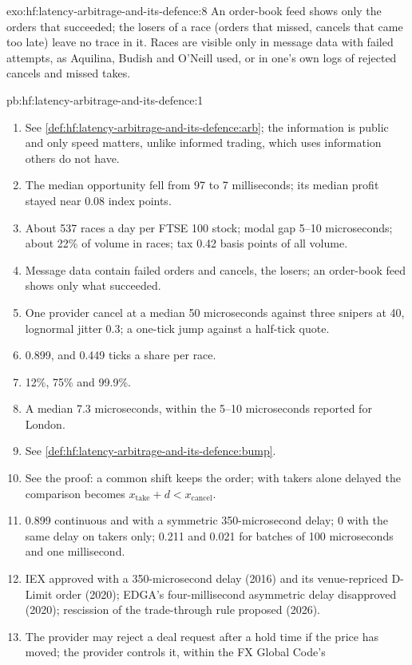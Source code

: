 \begin{solution}{exo:hf:latency-arbitrage-and-its-defence:8}
An order-book feed shows only the orders that succeeded; the losers of a race (orders that missed, cancels that came too late) leave no trace in it.
Races are visible only in message data with failed attempts, as Aquilina, Budish and O'Neill used, or in one's own logs of rejected cancels and
missed takes.
\end{solution}

\begin{solution}{pb:hf:latency-arbitrage-and-its-defence:1}
\begin{enumerate}
\item See \cref{def:hf:latency-arbitrage-and-its-defence:arb}; the information is public and only speed matters, unlike informed trading, which uses
information others do not have.
\item The median opportunity fell from 97 to 7 milliseconds; its median profit stayed near 0.08 index points.
\item About 537 races a day per FTSE 100 stock; modal gap 5--10 microseconds; about 22\% of volume in races; tax 0.42 basis points of all volume.
\item Message data contain failed orders and cancels, the losers; an order-book feed shows only what succeeded.
\item One provider cancel at a median 50 microseconds against three snipers at 40, lognormal jitter 0.3; a one-tick jump against a half-tick quote.
\item 0.899, and 0.449 ticks a share per race.
\item 12\%, 75\% and 99.9\%.
\item A median 7.3 microseconds, within the 5--10 microseconds reported for London.
\item See \cref{def:hf:latency-arbitrage-and-its-defence:bump}.
\item See the proof: a common shift keeps the order; with takers alone delayed the comparison becomes $x_{\text{take}}+d<x_{\text{cancel}}$.
\item 0.899 continuous and with a symmetric 350-microsecond delay; 0 with the same delay on takers only; 0.211 and 0.021 for batches of 100
microseconds and one millisecond.
\item IEX approved with a 350-microsecond delay (2016) and its venue-repriced D-Limit order (2020); EDGA's four-millisecond asymmetric delay
disapproved (2020); rescission of the trade-through rule proposed (2026).
\item The provider may reject a deal request after a hold time if the price has moved; the provider controls it, within the FX Global Code's

\end{enumerate}
\end{solution}
